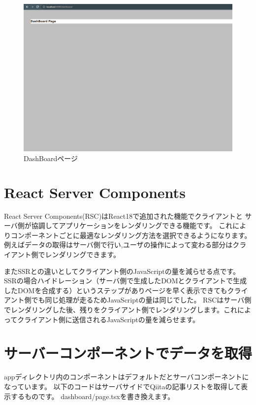 \begin{figure}[H]
  \centering
  \includegraphics[width=12cm]{./image/03-Tech/chap4/03.png}
  \caption{DashBoardページ}
\end{figure}










\section{React Server Components}
React Server Components(RSC)はReact18で追加された機能でクライアントと
サーバ側が協調してアプリケーションをレンダリングできる機能です。
これによりコンポーネントごとに最適なレンダリング方法を選択できるようになります。
例えばデータの取得はサーバ側で行い,ユーザの操作によって変わる部分はクライアント側でレンダリングできます。



またSSRとの違いとしてクライアント側のJavaScriptの量を減らせる点です。
SSRの場合ハイドレーション（サーバ側で生成したDOMとクライアントで生成したDOMを合成する）というステップがありページを早く表示できてもクライアント側でも同じ処理が走るためJavaScriptの量は同じでした。
RSCはサーバ側でレンダリングした後、残りをクライアント側でレンダリングします。これによってクライアント側に送信されるJavaScriptの量を減らせます。


\section{サーバーコンポーネントでデータを取得}


appディレクトリ内のコンポーネントはデフォルトだとサーバコンポーネントになっています。
以下のコードはサーバサイドでQiitaの記事リストを取得して表示するものです。
dashboard/page.tsxを書き換えます。



